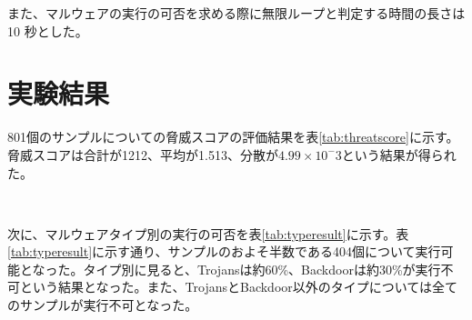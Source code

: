 \documentclass[12pt,a4paper,titlepage,report]{jsbook}
\begin{document}
また、マルウェアの実行の可否を求める際に無限ループと判定する時間の長さは 10 秒とした。


\section{実験結果}
801個のサンプルについての脅威スコアの評価結果を表\ref{tab:threatscore}に示す。脅威スコアは合計が1212、平均が1.513、分散が$4.99\times10^-3$という結果が得られた。

\begin{table}[htbp]
	\caption{脅威スコアの結果}
	\label{tab:threatscore}
	\centering
	\\
\end{table}

次に、マルウェアタイプ別の実行の可否を表\ref{tab:typeresult}に示す。表\ref{tab:typeresult}に示す通り、サンプルのおよそ半数である404個について実行可能となった。タイプ別に見ると、Trojansは約60\%、Backdoorは約30\%が実行不可という結果となった。また、TrojansとBackdoor以外のタイプについては全てのサンプルが実行不可となった。

\begin{table}[htbp]
	\caption{マルウェアタイプ別の実行の可否}
	\label{tab:typeresult}
	\centering
	\\
\end{table}
\end{document}
